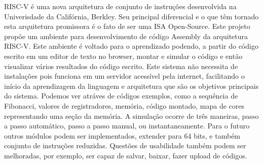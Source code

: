 RISC-V é uma nova arquitetura de conjunto de instruções desenvolvida na Univerisdade da Califórnia, Berkley. Seu principal diferencial e o que têm tornado esta arquitetura promissora é o fato de ser uma ISA Open-Source. Este projeto propõe um ambiente para desenvolvimento de código Assembly da arquitetura RISC-V. Este ambiente é voltado para o aprendizado podendo, a partir do código escrito em um editor de texto no browser, montar e simular o código e então visualizar vários resultados do código escrito. Este sistema não necessita de instalações pois funciona em um servidor acessível pela internet, facilitando o início da aprendizagem da linguagem e arquitetura que são os objetivos principais do sistema. Podemos ver atráves de códigos exemplos, como a sequência de Fibonacci, valores de registradores, memória, código montado, mapa de cores representando uma seção da memória. A simulação ocorre de três maneiras, passo a passo automático, passo a passo manual, ou instantaneamente. Para o futuro outros módulos podem ser implementados, extender para 64 bits, e também conjunto de instruções reduzidas. Questões de usabilidade também podem ser melhoradas, por exemplo, ser capaz de salvar, baixar, fazer upload de códigos.